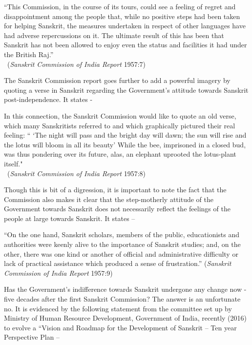 \begin{myquote}
\eleven
“This Commission, in the course of its tours, could see a feeling of regret and disappointment among the people that, while no positive steps had been taken for helping Sanskrit, the measures undertaken in respect of other languages have had adverse repercussions on it. The ultimate result of this has been that Sanskrit has not been allowed to enjoy even the status and facilities it had under the British Raj.”\\[-15pt] 

~\hfill({\sl Sanskrit Commission of India Report} 1957:7)
\end{myquote}

The Sanskrit Commission report goes further to add a powerful imagery by quoting a verse in Sanskrit regarding the Government’s attitude towards Sanskrit post-independence. It states -
\begin{myquote}
\eleven
In this connection, the Sanskrit Commission would like to quote an old verse, which many Sanskritists referred to and which graphically pictured their real feeling: `` `The night will pass and the bright day will dawn; the sun will rise and the lotus will bloom in all its beauty' While the bee, imprisoned in a closed bud, was thus pondering over its future, alas, an elephant uprooted the lotus-plant itself."\\[-15pt]   

~\hfill({\sl Sanskrit Commission of India Report} 1957:8)
\end{myquote}

Though this is bit of a digression, it is important to note the fact that the Commission also makes it clear that the step-motherly attitude of the Government towards Sanskrit does not necessarily reflect the feelings of the people at large towards Sanskrit.  It states – 

\begin{myquote}
\eleven
“On the one hand, Sanskrit scholars, members of the public, educationists and authorities were keenly alive to the importance of Sanskrit studies; and, on the other, there was one kind or another of official and administrative difficulty or lack of practical assistance which produced a sense of frustration.” \hfill({\sl Sanskrit Commission of India Report} 1957:9)
\end{myquote}

Has the Government’s indifference towards Sanskrit undergone any change now - five decades after the first Sanskrit Commission? The answer is an unfortunate no. It is evidenced by the following statement from the committee set up by Ministry of Human Resource Development, Government of India, recently (2016) to evolve a “Vision and Roadmap for the Development of Sanskrit – Ten year Perspective Plan – 


